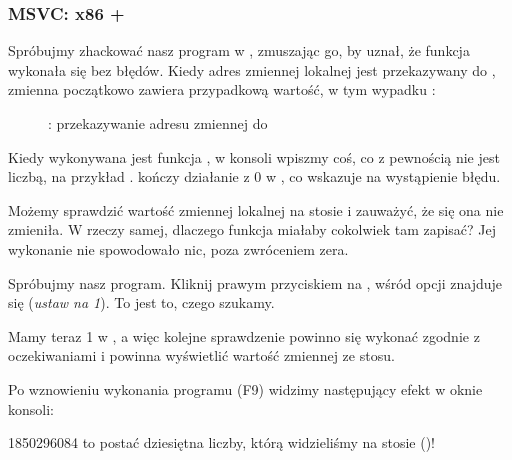 \clearpage
\subsubsection{MSVC: x86 + \olly}

Spróbujmy zhackować nasz program w \olly, zmuszając go, by uznał, że funkcja \scanf wykonała się bez błędów.
Kiedy adres zmiennej lokalnej jest przekazywany do \scanf,
zmienna początkowo zawiera przypadkową wartość, w tym wypadku :

\begin{figure}[H]
\centering
{}
\caption{\olly: przekazywanie adresu zmiennej do \scanf}
\label{fig:scanf_ex3_olly_1}
\end{figure}

\clearpage
Kiedy wykonywana jest funkcja \scanf , w konsoli wpiszmy coś, co z pewnością nie jest liczbą, na przykład .
\scanf kończy działanie z 0 w \EAX, co wskazuje na wystąpienie błędu.

Możemy sprawdzić wartość zmiennej lokalnej na stosie i zauważyć, że się ona nie zmieniła.
W rzeczy samej, dlaczego funkcja \scanf miałaby cokolwiek tam zapisać?
Jej wykonanie nie spowodowało nic, poza zwróceniem zera.

Spróbujmy  nasz program.
Kliknij prawym przyciskiem na \EAX,
wśród opcji znajduje się  (\emph{ustaw na 1}).
To jest to, czego szukamy.

Mamy teraz 1 w \EAX, a więc kolejne sprawdzenie powinno się wykonać zgodnie z oczekiwaniami i
\printf powinna wyświetlić wartość zmiennej ze stosu.

Po wznowieniu wykonania programu (F9) widzimy następujący efekt w oknie konsoli:



1850296084 to postać dziesiętna liczby, którą widzieliśmy na stosie ()!

